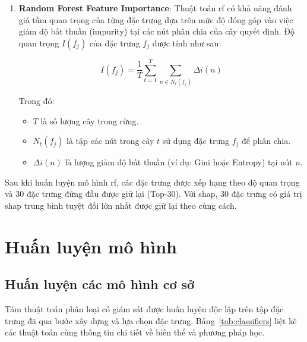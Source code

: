 \begin{enumerate}[label=\alph*)]
    Các đặc trưng có giá trị \ac{shap} lớn (theo độ lớn tuyệt đối) được xem là có ảnh hưởng quan trọng hơn đến quyết định của mô hình. Phương pháp này được ứng dụng rộng rãi trong giải thích mô hình phức tạp như XGBoost, Random Forest, và mạng nơ-ron \cite{lundberg2017unified}. 


    \item \textbf{Random Forest Feature Importance}: Thuật toán \ac{rf} có khả năng đánh giá tầm quan trọng của từng đặc trưng dựa trên mức độ đóng góp vào việc giảm độ bất thuần (impurity) tại các nút phân chia của cây quyết định. Độ quan trọng $I(f_j)$ của đặc trưng $f_j$ được tính như sau:

    \begin{equation}
    I(f_j) = \frac{1}{T} \sum_{t=1}^{T} \sum_{n \in N_t(f_j)} \Delta i(n)
    \end{equation}

    Trong đó:
    \begin{itemize}
        \item $T$ là số lượng cây trong rừng.
        \item $N_t(f_j)$ là tập các nút trong cây $t$ sử dụng đặc trưng $f_j$ để phân chia.
        \item $\Delta i(n)$ là lượng giảm độ bất thuần (ví dụ: Gini hoặc Entropy) tại nút $n$.
    \end{itemize}
\end{enumerate}

Sau khi huấn luyện mô hình \ac{rf}, các đặc trưng được xếp hạng theo độ quan trọng và 30 đặc trưng đứng đầu được giữ lại (Top-30). Với \ac{shap}, 30 đặc trưng có giá trị \ac{shap} trung bình tuyệt đối lớn nhất được giữ lại theo cùng cách.


\section{Huấn luyện mô hình}

\subsection{Huấn luyện các mô hình cơ sở}

Tám thuật toán phân loại có giám sát được huấn luyện độc lập trên tập đặc trưng
đã qua bước xây dựng và lựa chọn đặc trưng. Bảng~\ref{tab:classifiers} liệt kê các thuật toán cùng
thông tin chi tiết về biến thể và phương pháp học.

